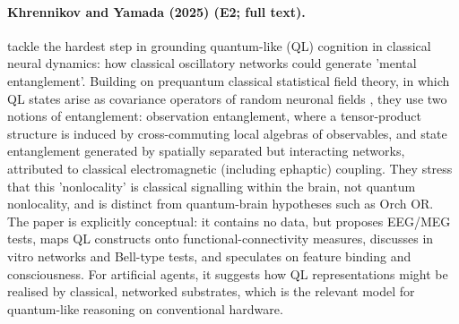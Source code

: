 \documentclass[10pt,a4paper]{article}
\begin{document}
\paragraph{Khrennikov and Yamada (2025) (E2; full text).} \citet{Khrennikov2025c} tackle the hardest step in grounding quantum-like (QL) cognition in classical neural dynamics: how classical oscillatory networks could generate 'mental entanglement'. Building on prequantum classical statistical field theory, in which QL states arise as covariance operators of random neuronal fields \citep{Khrennikov2025a}, they use two notions of entanglement: observation entanglement, where a tensor-product structure is induced by cross-commuting local algebras of observables, and state entanglement generated by spatially separated but interacting networks, attributed to classical electromagnetic (including ephaptic) coupling. They stress that this 'nonlocality' is classical signalling within the brain, not quantum nonlocality, and is distinct from quantum-brain hypotheses such as Orch OR. The paper is explicitly conceptual: it contains no data, but proposes EEG/MEG tests, maps QL constructs onto functional-connectivity measures, discusses in vitro networks and Bell-type tests, and speculates on feature binding and consciousness. For artificial agents, it suggests how QL representations might be realised by classical, networked substrates, which is the relevant model for quantum-like reasoning on conventional hardware.




\end{document}
